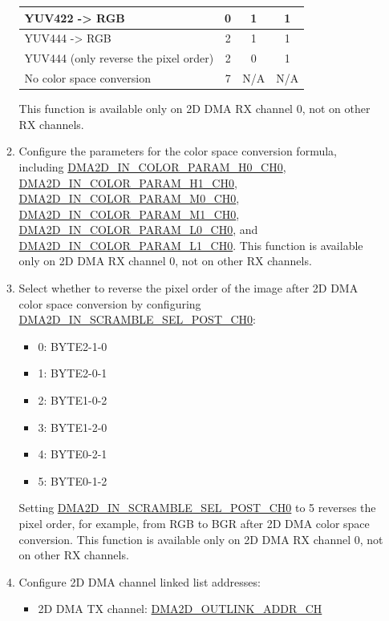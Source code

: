 \documentclass[main\_\_EN.tex]{subfiles}
\begin{document}
\begin{enumerate}
\begin{enumerate}
\begin{longtable}{ | l | c | c | c | }
        YUV422 -> RGB &  0  &  1  &  1 \\ \hline
        YUV444 -> RGB &  2  &  1  &  1 \\ \hline
        YUV444 (only reverse the pixel order) &  2  &  0  &  1 \\ \hline
        No color space conversion &  7  &  N/A  &  N/A \\ \hline
        \end{longtable}
        This function is available only on 2D DMA RX channel 0, not on other RX channels.
        \item Configure the parameters for the color space conversion formula, including \hyperref[fielddesc:DMA2DINCOLORPARAMH0CH0]{DMA2D\_IN\_COLOR\_PARAM\_H0\_CH0}, \hyperref[fielddesc:DMA2DINCOLORPARAMH1CH0]{DMA2D\_IN\_COLOR\_PARAM\_H1\_CH0}, \hyperref[fielddesc:DMA2DINCOLORPARAMM0CH0]{DMA2D\_IN\_COLOR\_PARAM\_M0\_CH0}, \hyperref[fielddesc:DMA2DINCOLORPARAMM1CH0]{DMA2D\_IN\_COLOR\_PARAM\_M1\_CH0}, \hyperref[fielddesc:DMA2DINCOLORPARAML0CH0]{DMA2D\_IN\_COLOR\_PARAM\_L0\_CH0}, and \hyperref[fielddesc:DMA2DINCOLORPARAML1CH0]{DMA2D\_IN\_COLOR\_PARAM\_L1\_CH0}. This function is available only on 2D DMA RX channel 0, not on other RX channels.
        \item Select whether to reverse the pixel order of the image after 2D DMA color space conversion by configuring \hyperref[fielddesc:DMA2DINSCRAMBLESELPOSTCH0]{DMA2D\_IN\_SCRAMBLE\_SEL\_POST\_CH0}:
        \begin{itemize}
            \item 0: BYTE2-1-0
            \item 1: BYTE2-0-1
            \item 2: BYTE1-0-2
            \item 3: BYTE1-2-0
            \item 4: BYTE0-2-1
            \item 5: BYTE0-1-2
        \end{itemize}
        Setting \hyperref[fielddesc:DMA2DINSCRAMBLESELPOSTCH0]{DMA2D\_IN\_SCRAMBLE\_SEL\_POST\_CH0} to 5 reverses the pixel order, for example, from RGB to BGR after 2D DMA color space conversion. This function is available only on 2D DMA RX channel 0, not on other RX channels.
        \item Configure 2D DMA channel linked list addresses:
        \begin{itemize}
            \item 2D DMA TX channel: \hyperref[fielddesc:DMA2DOUTLINKADDRCHN]{DMA2D\_OUTLINK\_ADDR\_CH}

\end{itemize}
\end{enumerate}
\end{enumerate}
\end{document}

